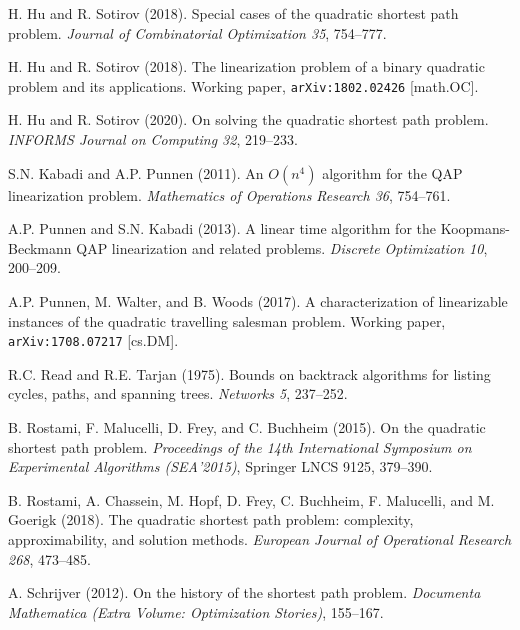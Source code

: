 \documentclass[11pt,fleqn]{article}
\begin{document}
\begin{thebibliography}{18}
{\sc H. Hu and R. Sotirov} (2018).
Special cases of the quadratic shortest path problem.
\emph{Journal of Combinatorial Optimization 35}, 754--777.

{\sc H. Hu and R. Sotirov} (2018).
The linearization problem of a binary quadratic problem and its applications.
Working paper, {\tt arXiv:1802.02426} [math.OC].

{\sc H. Hu and R. Sotirov} (2020).
On solving the quadratic shortest path problem.
\emph{INFORMS Journal on Computing 32}, 219--233.

{\sc S.N. Kabadi and A.P. Punnen} (2011).
An $O(n^4)$ algorithm for the {QAP} linearization problem.
\emph{Mathematics of Operations Research 36}, 754--761.

{\sc A.P. Punnen and S.N. Kabadi} (2013).
A linear time algorithm for the Koopmans-Beckmann {QAP} linearization and related problems.
\emph{Discrete Optimization 10}, 200--209.

{\sc A.P. Punnen, M. Walter, and B. Woods} (2017).
A characterization of linearizable instances of the quadratic travelling salesman problem.
Working paper, {\tt arXiv:1708.07217} [cs.DM].

{\sc R.C. Read and R.E. Tarjan} (1975).
Bounds on backtrack algorithms for listing cycles, paths, and spanning trees.
\emph{Networks 5}, 237--252.

{\sc B. Rostami, F. Malucelli, D. Frey, and C. Buchheim} (2015).
On the quadratic shortest path problem.
\emph{Proceedings of the 14th International Symposium on Experimental Algorithms (SEA'2015)},
Springer LNCS 9125, 379--390.

{\sc B. Rostami, A. Chassein, M. Hopf, D. Frey, C. Buchheim, F. Malucelli, and M. Goerigk} (2018).
The quadratic shortest path problem: complexity, approximability, and solution methods.
\emph{European Journal of Operational Research 268}, 473--485.

{\sc A. Schrijver} (2012).
On the history of the shortest path problem.
\emph{Documenta Mathematica (Extra Volume: Optimization Stories)}, 155--167.

\end{thebibliography}
\end{document}
